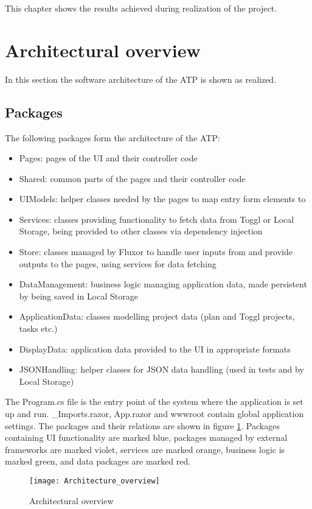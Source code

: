 
This chapter shows the results achieved during realization of the project.

\section{Architectural overview} \label{Architecture}
In this section the software architecture of the ATP is shown as realized.

\subsection{Packages}
The following packages form the architecture of the ATP:
\begin{itemize}
	\item Pages: pages of the UI and their controller code
	\item Shared: common parts of the pages and their controller code
	\item UIModels: helper classes needed by the pages to map entry form elements to
	\item Services: classes providing functionality to fetch data from Toggl or Local Storage, being provided to other classes via dependency injection
	\item Store: classes managed by Fluxor to handle user inputs from and provide outputs to the pages, using services for data fetching
	\item DataManagement: business logic managing application data, made persistent by being saved in Local Storage
	\item ApplicationData: classes modelling project data (plan and Toggl projects, tasks etc.)
	\item DisplayData: application data provided to the UI in appropriate formats
	\item JSONHandling: helper classes for JSON data handling (used in tests and by Local Storage)
\end{itemize}
The Program.cs file is the entry point of the system where the application is set up and run. \_Imports.razor, App.razor and wwwroot contain global application settings. The packages and their relations are shown in figure \ref{architecture_overview}. Packages containing UI functionality are marked blue, packages managed by external frameworks are marked violet, services are marked orange, business logic is marked green, and data packages are marked red.
\begin{figure}[H]
	\centering
	\texttt{[image: Architecture\_overview]}
	\caption{Architectural overview}
	\label{architecture_overview}
\end{figure}

